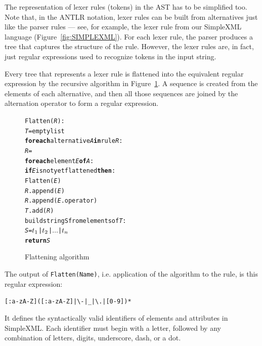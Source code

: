 The representation of lexer rules (tokens) in the AST has to be simplified too.
Note that, in the ANTLR notation, lexer rules can be built from alternatives just like the parser rules --- see, for example, the lexer rule  from our SimpleXML language (Figure~\ref{fig:SIMPLEXML}).
For each lexer rule, the parser produces a tree that captures the structure of the rule.
However, the lexer rules are, in fact, just regular expressions used to recognize tokens in the input string.

Every tree that represents a lexer rule is flattened into the equivalent regular expression by the recursive algorithm in Figure~\ref{fig:ALGFLATTEN}.
A sequence is created from the elements of each alternative, and then all those sequences are joined by the alternation operator \code{$|$} to form a regular expression.

\begin{figure}[ht]
\centering
\begin{framed}
\begin{alltt}
\small
Flatten(\textit{R}):
  \textit{T} = empty list
  \textbf{for each} alternative \textit{A} \textbf{in} rule \textit{R}:
    \textit{R} = \antlrap\antlrap
    \textbf{for each} element \textit{E} \textbf{of} \textit{A}:
      \textbf{if} \textit{E} is not yet flattened \textbf{then}:
        Flatten(\textit{E})
      \textit{R}.append(\textit{E})
      \textit{R}.append(\textit{E}.operator)
    \textit{T}.add(\textit{R})
  build string S from elements of \textit{T}:
    \textit{S} = \(t\sb{1}\) | \(t\sb{2}\) | \(\ldots\) | \(t\sb{n}\)
  \textbf{return} \textit{S}
\end{alltt}
\end{framed}
\caption{Flattening algorithm}
\label{fig:ALGFLATTEN}
\end{figure}

The output of \texttt{Flatten(Name)}, i.e. application of the algorithm to the  rule, is this regular expression:

\begin{center}
  \texttt{[:a-zA-Z]([:a-zA-Z]|\textbackslash-|{\_}|\textbackslash.|[0-9])*}
\end{center}
It defines the syntactically valid identifiers of elements and attributes in SimpleXML.
Each identifier must begin with a letter, followed by any combination of letters, digits, underscore, dash, or a dot.

